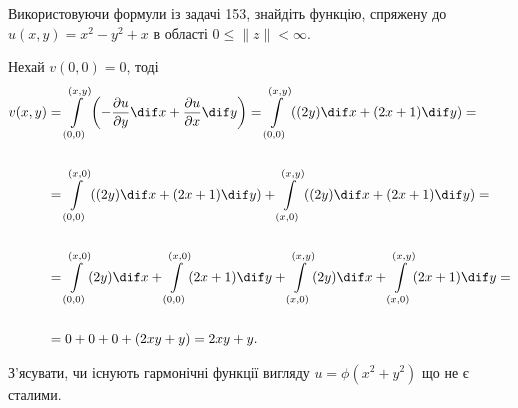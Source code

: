 \begin{problem}[Волковиський, 159]
    Використовуючи формули із задачі 153, знайдіть функцію, спряжену до $u(x, y) = x^2 - y^2 + x$ в області $0 \le \|z\| < \infty$.
\end{problem}

\begin{solution}
    Нехай $v(0, 0) = 0$, тоді
    \begin{align*}
    v(x, y) &= \Int_{(0, 0)}^{(x, y)} \left(- \dfrac{\partial u}{\partial y} \dif x + \dfrac{\partial u}{\partial x} \dif y\right) = \Int_{(0, 0)}^{(x, y)} \left((2 y) \dif x + (2x + 1) \dif y\right) = \\
    \\
    &= \Int_{(0, 0)}^{(x, 0)} \left((2 y) \dif x + (2x + 1) \dif y\right) + \Int_{(x, 0)}^{(x, y)} \left((2 y) \dif x + (2x + 1) \dif y\right) = \\
    \\
    &= \Int_{(0, 0)}^{(x, 0)} (2 y) \dif x + \Int_{(0, 0)}^{(x, 0)} (2x + 1) \dif y + \Int_{(x, 0)}^{(x, y)} (2 y) \dif x + \Int_{(x, 0)}^{(x, y)} (2x + 1) \dif y = \\
    \\
    &= 0 + 0 + 0 + (2 x y + y) = 2xy + y.
    \end{align*}
\end{solution}

\begin{problem}[Волковиський, 173]
    З'ясувати, чи існують гармонічні функції вигляду $u = \phi(x^2 + y^2)$ що не є сталими.
\end{problem}

